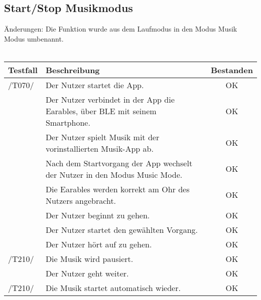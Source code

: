 \documentclass[a4paper,12pt]{article}
\begin{document}
\subsection{Start/Stop Musikmodus}
Änderungen: Die Funktion wurde aus dem Laufmodus in den Modus \glqq Musik Modus\grqq{} umbenannt.
\\
\\
\begin{tabular}{ |p{1.5cm} | p{12cm} | c| }
	\hline
	\textbf{Testfall} & \textbf{Beschreibung} & \textbf{Bestanden}\\
	\hline
	/T070/ & Der Nutzer startet die App. & OK\\
	\hline
	& Der Nutzer verbindet in der App die Earables, über BLE mit seinem Smartphone. & OK\\
	\hline
	& Der Nutzer spielt Musik mit der vorinstallierten Musik-App ab. & OK\\
	\hline
	& Nach dem Startvorgang der App wechselt der Nutzer in den Modus \glqq Music Mode\grqq . & OK\\
	\hline
	& Die Earables werden korrekt am Ohr des Nutzers angebracht. & OK\\
	\hline
	& Der Nutzer beginnt zu gehen. & OK \\
	\hline
	& Der Nutzer startet den gewählten Vorgang. & OK \\
	\hline
	& Der Nutzer hört auf zu gehen. & OK \\
	\hline
	/T210/ & Die Musik wird pausiert. & OK \\
	\hline
	& Der Nutzer geht weiter. & OK \\
	\hline
	/T210/ & Die Musik startet automatisch wieder. & OK \\
	\hline
\end{tabular}
\end{document}
